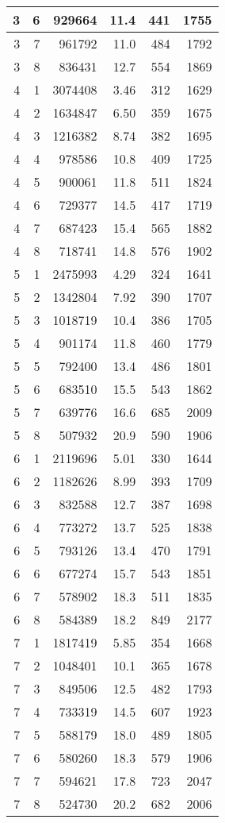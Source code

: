 \documentclass[10pt,twocolumn,a4paper]{article}
\begin{document}
\begin{table}[thb]
{\begin{tabular}{|r|r|r|r|r|r|}
 3 & 6 & 929664  & 11.4 & 441 & 1755
\\ \hline
 3 & 7 & 961792  & 11.0 & 484 & 1792
\\ \hline
 3 & 8 & 836431  & 12.7 & 554 & 1869
\\ \hline
 4 & 1 & 3074408 & 3.46 & 312 & 1629
\\ \hline
 4 & 2 & 1634847 & 6.50 & 359 & 1675
\\ \hline
 4 & 3 & 1216382 & 8.74 & 382 & 1695
\\ \hline
 4 & 4 & 978586  & 10.8 & 409 & 1725
\\ \hline
 4 & 5 & 900061  & 11.8 & 511 & 1824
\\ \hline
 4 & 6 & 729377  & 14.5 & 417 & 1719
\\ \hline
 4 & 7 & 687423  & 15.4 & 565 & 1882
\\ \hline
 4 & 8 & 718741  & 14.8 & 576 & 1902
\\ \hline
 5 & 1 & 2475993 & 4.29 & 324 & 1641
\\ \hline
 5 & 2 & 1342804 & 7.92 & 390 & 1707
\\ \hline
 5 & 3 & 1018719 & 10.4 & 386 & 1705
\\ \hline
 5 & 4 & 901174  & 11.8 & 460 & 1779
\\ \hline
 5 & 5 & 792400  & 13.4 & 486 & 1801
\\ \hline
 5 & 6 & 683510  & 15.5 & 543 & 1862
\\ \hline
 5 & 7 & 639776  & 16.6 & 685 & 2009
\\ \hline
 5 & 8 & 507932  & 20.9 & 590 & 1906
\\ \hline
 6 & 1 & 2119696 & 5.01 & 330 & 1644
\\ \hline
 6 & 2 & 1182626 & 8.99 & 393 & 1709
\\ \hline
 6 & 3 & 832588  & 12.7 & 387 & 1698
\\ \hline
 6 & 4 & 773272  & 13.7 & 525 & 1838
\\ \hline
 6 & 5 & 793126  & 13.4 & 470 & 1791
\\ \hline
 6 & 6 & 677274  & 15.7 & 543 & 1851
\\ \hline
 6 & 7 & 578902  & 18.3 & 511 & 1835
\\ \hline
 6 & 8 & 584389  & 18.2 & 849 & 2177
\\ \hline
 7 & 1 & 1817419 & 5.85 & 354 & 1668
\\ \hline
 7 & 2 & 1048401 & 10.1 & 365 & 1678
\\ \hline
 7 & 3 & 849506  & 12.5 & 482 & 1793
\\ \hline
 7 & 4 & 733319  & 14.5 & 607 & 1923
\\ \hline
 7 & 5 & 588179  & 18.0 & 489 & 1805
\\ \hline
 7 & 6 & 580260  & 18.3 & 579 & 1906
\\ \hline
 7 & 7 & 594621  & 17.8 & 723 & 2047
\\ \hline
 7 & 8 & 524730  & 20.2 & 682 & 2006
\\ \hline
\end{tabular}
\clearpage{}
}
\end{table}
\end{document}
